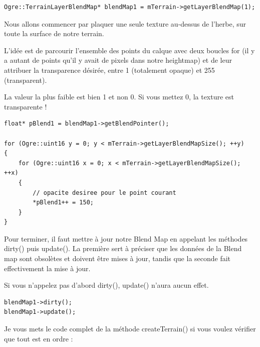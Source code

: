 \begin{lstlisting}[caption={Récupération du Blend Map pour le premier terrain}]
Ogre::TerrainLayerBlendMap* blendMap1 = mTerrain->getLayerBlendMap(1);
\end{lstlisting}

Nous allons commencer par plaquer une seule texture au-dessus de l'herbe, sur toute la surface de notre terrain.

L'idée est de parcourir l'ensemble des points du calque avec deux boucles for (il y a autant de points qu'il y avait de pixels dans notre heightmap) et de leur attribuer la transparence désirée, entre 1 (totalement opaque) et 255 (transparent).

La valeur la plus faible est bien 1 et non 0. Si vous mettez 0, la texture est transparente !

\begin{lstlisting}[caption={Attribution de la transparence désirée sur tous les points du calque}]
float* pBlend1 = blendMap1->getBlendPointer();

for (Ogre::uint16 y = 0; y < mTerrain->getLayerBlendMapSize(); ++y)
{
    for (Ogre::uint16 x = 0; x < mTerrain->getLayerBlendMapSize(); ++x)
    {   
        // opacite desiree pour le point courant
        *pBlend1++ = 150;
    }
}
\end{lstlisting}















Pour terminer, il faut mettre à jour notre Blend Map en appelant les méthodes dirty() puis update(). La première sert à préciser que les données de la Blend map sont obsolètes et doivent être mises à jour, tandis que la seconde fait effectivement la mise à jour.

Si vous n'appelez pas d'abord dirty(), update() n'aura aucun effet.

\begin{lstlisting}[caption={Mise à jour de la Blend Map}]
blendMap1->dirty();
blendMap1->update();
\end{lstlisting}

Je vous mets le code complet de la méthode createTerrain() si vous voulez vérifier que tout est en ordre :

